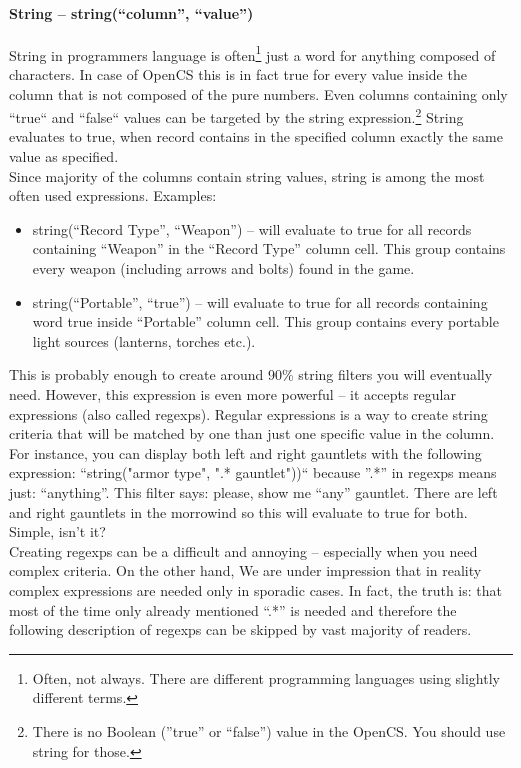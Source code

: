 \paragraph{String -- string(``column'', ``value'')}
String in programmers language is often\footnote{Often, not always. There are different programming languages using slightly different terms.} just a word for anything composed of characters. In case of OpenCS this is in fact true for every value inside the column that is not composed of the pure numbers. Even columns containing only ``true`` and ``false`` values can be targeted by the string expression.\footnote{There is no Boolean (''true'' or ``false'') value in the OpenCS. You should use string for those.} String evaluates to true, when record contains in the specified column exactly the same value as specified.
\\
Since majority of the columns contain string values, string is among the most often used expressions. Examples:
\begin{itemize}
 \item string(``Record Type'', ``Weapon'') -- will evaluate to true for all records containing ``Weapon'' in the ``Record Type'' column cell. This group contains every weapon (including arrows and bolts) found in the game.
 \item string(``Portable'', ``true'') -- will evaluate to true for all records containing word true inside ``Portable'' column cell. This group contains every portable light sources (lanterns, torches etc.).
\end{itemize}
This is probably enough to create around 90\% string filters you will eventually need. However, this expression is even more powerful -- it accepts regular expressions (also called regexps). Regular expressions is a way to create string criteria that will be matched by one than just one specific value in the column. For instance, you can display both left and right gauntlets with the following expression: ``string("armor type", ".* gauntlet"))`` because ''.*'' in regexps means just: ``anything''. This filter says: please, show me ``any'' gauntlet. There are left and right gauntlets in the morrowind so this will evaluate to true for both. Simple, isn't it?
\\
Creating regexps can be a difficult and annoying -- especially when you need complex criteria. On the other hand, We are under impression that in reality complex expressions are needed only in sporadic cases. In fact, the truth is: that most of the time only already mentioned ``.*'' is needed and therefore the following description of regexps can be skipped by vast majority of readers.\\

